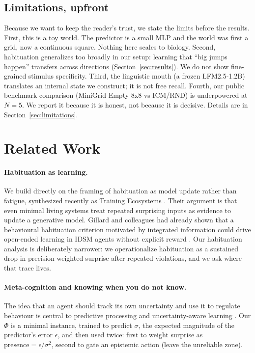 \documentclass[11pt,a4paper]{article}
\begin{document}
\subsection{Limitations, upfront}

Because we want to keep the reader's trust, we state the limits before the results. First, this is a toy world. The predictor is a small MLP and the world was first a grid, now a continuous square. Nothing here scales to biology. Second, habituation generalizes too broadly in our setup: learning that ``big jumps happen'' transfers across directions (Section~\ref{sec:results}). We do not show fine-grained stimulus specificity. Third, the linguistic mouth (a frozen LFM2.5-1.2B) translates an internal state we construct; it is not free recall. Fourth, our public benchmark comparison (MiniGrid Empty-8x8 vs ICM/RND) is underpowered at $N=5$. We report it because it is honest, not because it is decisive. Details are in Section~\ref{sec:limitations}.

\section{Related Work}
\label{sec:related}

\paragraph{Habituation as learning.} We build directly on the framing of habituation as model update rather than fatigue, synthesized recently as Training Ecosystems \cite{levin2026}. Their argument is that even minimal living systems treat repeated surprising inputs as evidence to update a generative model. Gillard and colleagues had already shown that a behavioural habituation criterion motivated by integrated information could drive open-ended learning in IDSM agents without explicit reward \cite{gillard2022}. Our habituation analysis is deliberately narrower: we operationalize habituation as a sustained drop in precision-weighted surprise after repeated violations, and we ask where that trace lives.

\paragraph{Meta-cognition and knowing when you do not know.} The idea that an agent should track its own uncertainty and use it to regulate behaviour is central to predictive processing and uncertainty-aware learning \cite{friston2010, laukkonen2025}. Our $\Phi$ is a minimal instance, trained to predict $\sigma$, the expected magnitude of the predictor's error $\epsilon$, and then used twice: first to weight surprise as $\mathrm{presence} = \epsilon / \sigma^2$, second to gate an epistemic action (leave the unreliable zone).
\end{document}
